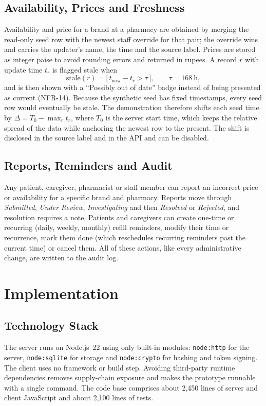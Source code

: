 \documentclass[conference]{IEEEtran}
\begin{document}
\subsection{Availability, Prices and Freshness}
Availability and price for a brand at a pharmacy are obtained by merging the read-only seed row with the newest staff override for that pair; the override wins and carries the updater's name, the time and the source label. Prices are stored as integer paise to avoid rounding errors and returned in rupees. A record $r$ with update time $t_r$ is flagged stale when
\begin{equation}
\mathrm{stale}(r) = \big[\, t_{\mathrm{now}} - t_r > \tau \,\big], \qquad \tau = 168\ \mathrm{h},
\label{eq:stale}
\end{equation}
and is then shown with a ``Possibly out of date'' badge instead of being presented as current (NFR-14). Because the synthetic seed has fixed timestamps, every seed row would eventually be stale. The demonstration therefore shifts each seed time by $\Delta = T_0 - \max_r t_r$, where $T_0$ is the server start time, which keeps the relative spread of the data while anchoring the newest row to the present. The shift is disclosed in the source label and in the API and can be disabled.

\subsection{Reports, Reminders and Audit}
Any patient, caregiver, pharmacist or staff member can report an incorrect price or availability for a specific brand and pharmacy. Reports move through \emph{Submitted}, \emph{Under Review}, \emph{Investigating} and then \emph{Resolved} or \emph{Rejected}, and resolution requires a note. Patients and caregivers can create one-time or recurring (daily, weekly, monthly) refill reminders, modify their time or recurrence, mark them done (which reschedules recurring reminders past the current time) or cancel them. All of these actions, like every administrative change, are written to the audit log.

\section{Implementation}\label{sec:impl}

\subsection{Technology Stack}
The server runs on Node.js~22 \cite{nodejs} using only built-in modules: \texttt{node:http} for the server, \texttt{node:sqlite} for storage and \texttt{node:crypto} for hashing and token signing. The client uses no framework or build step. Avoiding third-party runtime dependencies removes supply-chain exposure and makes the prototype runnable with a single command. The code base comprises about 2{,}450 lines of server and client JavaScript and about 2{,}100 lines of tests.
\end{document}
